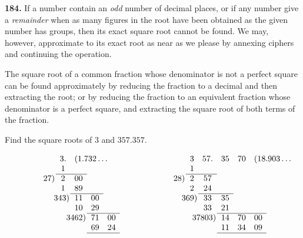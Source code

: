 \documentclass[12pt]{book}[2005/09/16]
\newcommand{\Paragraph}[1]{\medskip\par\textbf{#1}}
\newenvironment{Soln}[1][]{\par\small\textsc{#1}}{\par}
\newcommand{\Item}[1]{\vspace{4pt plus 16pt}\makebox[1em][r]{\textbf{#1}\ }}
\begin{document}
\Paragraph{184.}  If a number contain an \emph{odd} number of decimal
places, or if any number give a \emph{remainder} when as many
figures in the root have been obtained as the given number
has groups, then its exact square root cannot be found.  We
may, however, approximate to its exact root as near as we
please by annexing ciphers and continuing the operation.

The square root of a common fraction whose denominator
is not a perfect square can be found approximately by
reducing the fraction to a decimal and then extracting the
root; or by reducing the fraction to an equivalent fraction
whose denominator is a perfect square, and extracting the
square root of both terms of the fraction.

\newpage
\Item{1.}  Find the square roots of $3$ and $357.357$.
\begin{Soln}
\[
\begin{array}{rcccl}
   &3.&\multicolumn{3}{l}{(\rlap{$1.732\dots$}} \\
   &1 \\
\cline{2-3}
27\rlap{)}
   &2&00 \\
   &1&89 \\
\cline{3-4}
\multicolumn{2}{r}{343\rlap{)}}
     &11&00 \\
    &&10&29 \\
\cline{4-5}
\multicolumn{3}{r}{3462\rlap{)}}
        &71&00 \\
&&      &69&24 \\
\cline{4-5}
\end{array}\qquad\qquad\qquad
\begin{array}{rcclll}
   &3&57.&35&70&\rlap{$(18.903\dots$} \\
   &1 \\
\cline{2-3}
28\rlap{)}
   &2&57 \\
   &2&24 \\
\cline{3-4}
\multicolumn{2}{r}{369\rlap{)}}
     &33&35 \\
&    &33&21 \\
\cline{4-6}
\multicolumn{3}{r}{37803\rlap{)}}
        &14&70&00 \\
&&      &11&34&09 \\
\cline{4-6}
\end{array}
\]
\end{Soln}
\end{document}
